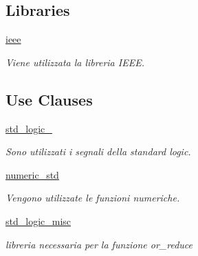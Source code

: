 \subsection*{Libraries}
 \begin{DoxyCompactItemize}
\item 
\mbox{\label{classUART__v1__0__S00__AXI_a0a6af6eef40212dbaf130d57ce711256}} 
\hyperlink{classUART__v1__0__S00__AXI_a0a6af6eef40212dbaf130d57ce711256}{ieee} 
\begin{DoxyCompactList}\small\item\em Viene utilizzata la libreria I\+E\+EE. \end{DoxyCompactList}\end{DoxyCompactItemize}
\subsection*{Use Clauses}
 \begin{DoxyCompactItemize}
\item 
\mbox{\label{classUART__v1__0__S00__AXI_acd03516902501cd1c7296a98e22c6fcb}} 
\hyperlink{classUART__v1__0__S00__AXI_acd03516902501cd1c7296a98e22c6fcb}{std\+\_\+logic\+\_}   
\begin{DoxyCompactList}\small\item\em Sono utilizzati i segnali della standard logic. \end{DoxyCompactList}\item 
\mbox{\label{classUART__v1__0__S00__AXI_a2edc34402b573437d5f25fa90ba4013e}} 
\hyperlink{classUART__v1__0__S00__AXI_a2edc34402b573437d5f25fa90ba4013e}{numeric\+\_\+std}   
\begin{DoxyCompactList}\small\item\em Vengono utilizzate le funzioni numeriche. \end{DoxyCompactList}\item 
\mbox{\label{classUART__v1__0__S00__AXI_acb2d98d781f19c8f5f4109576ec45502}} 
\hyperlink{classUART__v1__0__S00__AXI_acb2d98d781f19c8f5f4109576ec45502}{std\+\_\+logic\+\_\+misc}   
\begin{DoxyCompactList}\small\item\em libreria necessaria per la funzione or\+\_\+reduce \end{DoxyCompactList}\end{DoxyCompactItemize}
